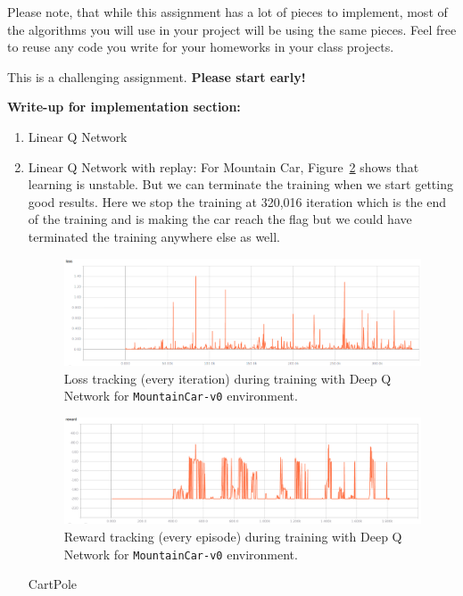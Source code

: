 \documentclass[12pt]{article}
\begin{document}
Please note, that while this assignment has a lot of pieces to implement, most of the algorithms you will use in your project will be using the same pieces. Feel free to reuse any code you write for your
homeworks in your class projects.


This is a challenging assignment. 
\textbf{Please start early!}


\nocite{*}




\newpage
\textbf{Write-up for implementation section: }
\begin{enumerate}
\item Linear Q Network
\item Linear Q Network with replay: For Mountain Car,  Figure~\ref{fig:MountainCar_linear_replay_reward} shows that learning is unstable. But we can terminate the training when we start getting good results. Here we stop the training at 320,016 iteration which is the end of the training and is making the car reach the flag but we could have terminated the training anywhere else as well.

\begin{figure}[h]
  \centering
  \includegraphics[width=1\textwidth]{figures/MountainCar_linear_replay_loss.png}
  \caption{\label{fig:MountainCar_linear_replay_loss} Loss tracking (every iteration) during training with Deep Q Network for \texttt{MountainCar-v0} environment.}
\end{figure}

\begin{figure}[h]
  \centering
  \includegraphics[width=1\textwidth]{figures/MountainCar_linear_replay_reward.png}
  \caption{\label{fig:MountainCar_linear_replay_reward} Reward tracking (every episode) during training with Deep Q Network for \texttt{MountainCar-v0} environment.}
\end{figure}CartPole


\end{enumerate}
\end{document}

